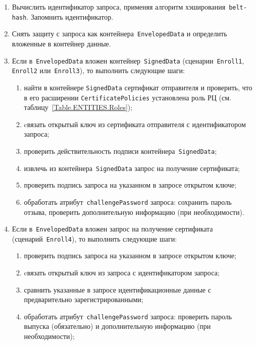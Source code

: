 \begin{enumerate}
\item
Вычислить идентификатор запроса, применяя 
алгоритм хэширования~\texttt{belt-hash}. 
Запомнить идентификатор.

\item
Снять защиту с запроса как контейнера~\texttt{EnvelopedData} 
и определить вложенные в контейнер данные.

\item
Если в~\texttt{EnvelopedData} вложен контейнер~\texttt{SignedData}
(сценарии~\texttt{Enroll1}, \texttt{Enroll2} или~\texttt{Enroll3}), 
то выполнить следующие шаги:

\begin{enumerate}
\item
найти в контейнере \texttt{SignedData} сертификат отправителя
и проверить, что в его расширении \texttt{CertificatePolicies} 
установлена роль РЦ (см. таблицу~\ref{Table.ENTITIES.Roles});
\item
cвязать открытый ключ из сертификата отправителя с идентификатором 
запроса;
\item
проверить действительность подписи контейнера~\texttt{SignedData};
\item
извлечь из контейнера~\texttt{SignedData} запрос на получение сертификата;
\item
проверить подпись запроса на указанном в запросе открытом ключе;
\item
обработать атрибут~\texttt{challengePassword} запроса:
сохранить пароль отзыва, проверить дополнительную информацию
(при необходимости).
\end{enumerate}

\item
Если в~\texttt{EnvelopedData} вложен запрос на получение сертификата
(сценарий~\texttt{Enroll4}), то выполнить следующие шаги:
\begin{enumerate}
\item
проверить подпись запроса на указанном в запросе открытом ключе;
\item
cвязать открытый ключ из запроса с идентификатором запроса;
\item
сравнить указанные в запросе идентификационные данные с предварительно
зарегистрированными;
\item
обработать атрибут~\texttt{challengePassword} запроса:
проверить пароль выпуска (обязательно) и  
дополнительную информацию (при необходимости);
\end{enumerate}


\end{enumerate}
